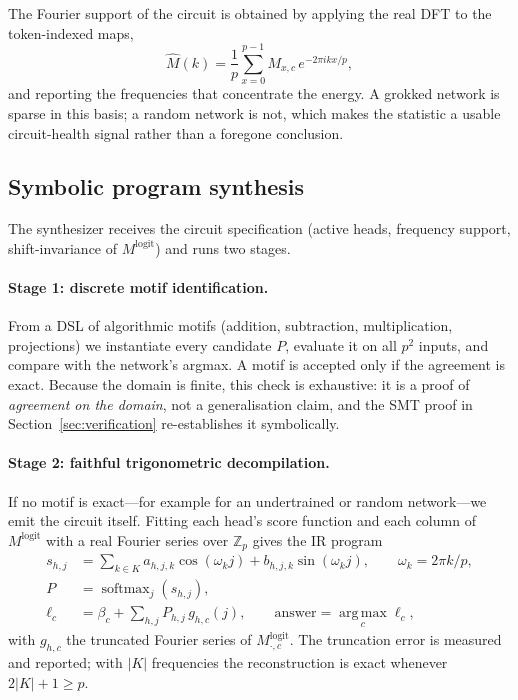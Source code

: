 \documentclass[11pt]{article}
\newcommand{\Zp}{\mathbb{Z}_p}
\newcommand{\argmax}{\operatorname*{arg\,max}}
\begin{document}
The Fourier support of the circuit is obtained by applying the real DFT to the
token-indexed maps,
\begin{equation}
  \hat M(k) = \frac{1}{p}\sum_{x=0}^{p-1} M_{x,c}\,e^{-2\pi i kx/p},
\end{equation}
and reporting the frequencies that concentrate the energy. A grokked network is
sparse in this basis; a random network is not, which makes the statistic a
usable circuit-health signal rather than a foregone conclusion.

\subsection{Symbolic program synthesis}

The synthesizer receives the circuit specification (active heads, frequency
support, shift-invariance of $M^{\text{logit}}$) and runs two stages.

\paragraph{Stage 1: discrete motif identification.}
From a DSL of algorithmic motifs (addition, subtraction, multiplication,
projections) we instantiate every candidate $P$, evaluate it on all $p^2$
inputs, and compare with the network's argmax. A motif is accepted only if the
agreement is exact. Because the domain is finite, this check is exhaustive: it
is a proof of \emph{agreement on the domain}, not a generalisation claim, and the
SMT proof in Section~\ref{sec:verification} re-establishes it symbolically.

\paragraph{Stage 2: faithful trigonometric decompilation.}
If no motif is exact---for example for an undertrained or random network---we
emit the circuit itself. Fitting each head's score function and each column of
$M^{\text{logit}}$ with a real Fourier series over $\Zp$ gives the IR program
\begin{align}
  s_{h,j} &= \sum_{k\in K} a_{h,j,k}\cos(\omega_k j) + b_{h,j,k}\sin(\omega_k j),
  \qquad \omega_k = 2\pi k/p,\\
  P &= \operatorname{softmax}_j(s_{h,j}), \\
  \ell_c &= \beta_c + \sum_{h,j} P_{h,j}\, g_{h,c}(j), \qquad
  \text{answer} = \argmax_c \ell_c ,
\end{align}
with $g_{h,c}$ the truncated Fourier series of $M^{\text{logit}}_{\cdot,c}$. The
truncation error is measured and reported; with $|K|$ frequencies the
reconstruction is exact whenever $2|K|+1 \ge p$.
\end{document}
